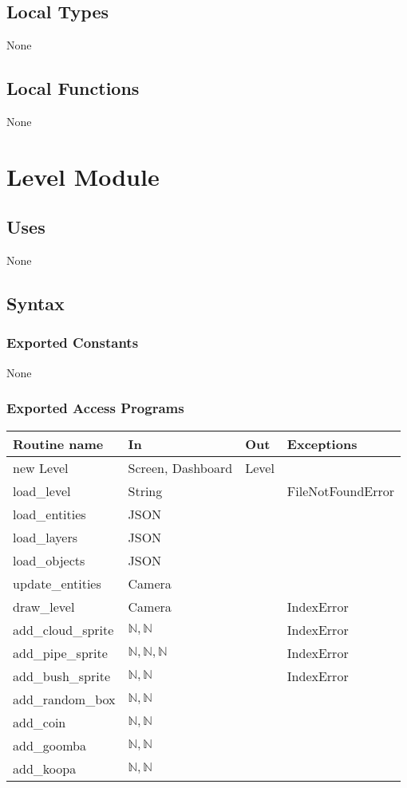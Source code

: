 \documentclass[12pt]{article}
\begin{document}
\subsection* {Local Types}

None

\subsection* {Local Functions}

None

\newpage

\section*{Level Module}
\subsection*{Uses}
None
\subsection*{Syntax}
\subsubsection*{Exported Constants}
None
\subsubsection*{Exported Access Programs}
\begin{tabular}{| l | l | l | p{5cm} |}
\hline
\textbf{Routine name} & \textbf{In} & \textbf{Out} & \textbf{Exceptions}\\
\hline
new Level & Screen, Dashboard & Level & \\
\hline
load\_level & String & & FileNotFoundError\\
\hline
load\_entities & JSON &  & \\
\hline
load\_layers & JSON & & \\
\hline
load\_objects & JSON & &\\
\hline
update\_entities & Camera & &\\
\hline
draw\_level & Camera & & IndexError\\
\hline
add\_cloud\_sprite & $\mathbb{N}, \mathbb{N}$ & & IndexError\\
\hline
add\_pipe\_sprite  & $\mathbb{N}, \mathbb{N}, \mathbb{N}$ & & IndexError\\
\hline
add\_bush\_sprite & $\mathbb{N}, \mathbb{N}$ & & IndexError\\
\hline
add\_random\_box & $\mathbb{N}, \mathbb{N}$ & & \\
\hline
add\_coin & $\mathbb{N}, \mathbb{N}$ & &\\
\hline
add\_goomba & $\mathbb{N}, \mathbb{N}$ & &\\
\hline
add\_koopa & $\mathbb{N}, \mathbb{N}$ & &\\
\hline
\end{tabular}
\end{document}
